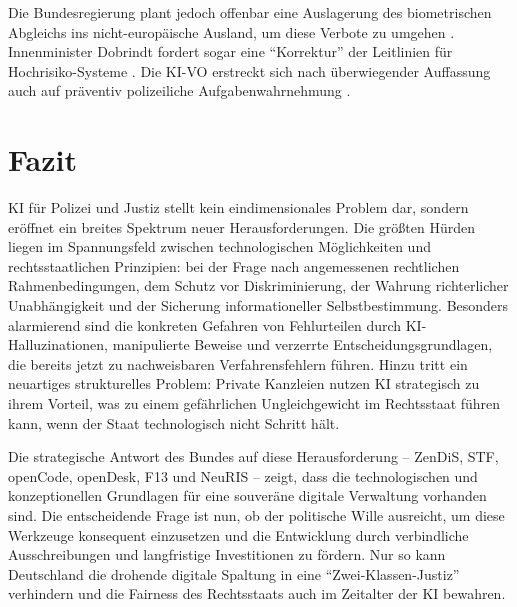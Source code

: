 \documentclass[12pt,a4paper]{article}
\begin{document}
	Die Bundesregierung plant jedoch offenbar eine Auslagerung des biometrischen Abgleichs ins nicht-europäische Ausland, um diese Verbote zu umgehen \cite{Gruene2026}. Innenminister Dobrindt fordert sogar eine \enquote{Korrektur} der Leitlinien für Hochrisiko-Systeme \cite{Dobrindt2026}. Die KI-VO erstreckt sich nach überwiegender Auffassung auch auf präventiv polizeiliche Aufgabenwahrnehmung \cite{Kriminalpolizei2026}.
	
	\section{Fazit}
	
	KI für Polizei und Justiz stellt kein eindimensionales Problem dar, sondern eröffnet ein breites Spektrum neuer Herausforderungen. Die größten Hürden liegen im Spannungsfeld zwischen technologischen Möglichkeiten und rechtsstaatlichen Prinzipien: bei der Frage nach angemessenen rechtlichen Rahmenbedingungen, dem Schutz vor Diskriminierung, der Wahrung richterlicher Unabhängigkeit und der Sicherung informationeller Selbstbestimmung. Besonders alarmierend sind die konkreten Gefahren von Fehlurteilen durch KI-Halluzinationen, manipulierte Beweise und verzerrte Entscheidungsgrundlagen, die bereits jetzt zu nachweisbaren Verfahrensfehlern führen. Hinzu tritt ein neuartiges strukturelles Problem: Private Kanzleien nutzen KI strategisch zu ihrem Vorteil, was zu einem gefährlichen Ungleichgewicht im Rechtsstaat führen kann, wenn der Staat technologisch nicht Schritt hält.
	
	Die strategische Antwort des Bundes auf diese Herausforderung – ZenDiS, STF, openCode, openDesk, F13 und NeuRIS – zeigt, dass die technologischen und konzeptionellen Grundlagen für eine souveräne digitale Verwaltung vorhanden sind. Die entscheidende Frage ist nun, ob der politische Wille ausreicht, um diese Werkzeuge konsequent einzusetzen und die Entwicklung durch verbindliche Ausschreibungen und langfristige Investitionen zu fördern. Nur so kann Deutschland die drohende digitale Spaltung in eine \enquote{Zwei-Klassen-Justiz} verhindern und die Fairness des Rechtsstaats auch im Zeitalter der KI bewahren.
	
\end{document}
